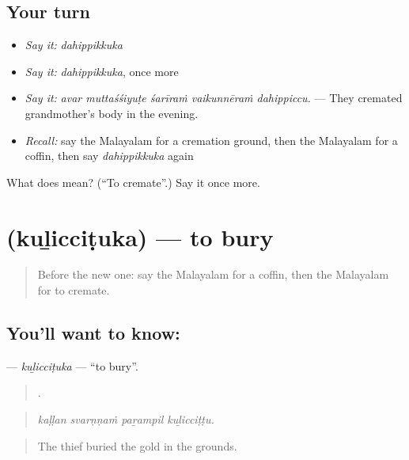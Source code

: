 \subsection*{Your turn}
\begin{itemize}
\raggedright
  \item \emph{Say it:} \emph{dahippikkuka}
  \item \emph{Say it:} \emph{dahippikkuka}, once more
  \item \emph{Say it:} \emph{avar muttaśśiyuṭe śarīraṁ vaikunnēraṁ dahippiccu.} — They cremated grandmother's body in the evening.
  \item \emph{Recall:} say the Malayalam for a cremation ground, then the Malayalam for a coffin, then say \emph{dahippikkuka} again
\end{itemize}

\begin{tcolorbox}[breakable,colback=teal!4,colframe=teal!35!black,title={Before you move on}]
What does  mean? (\textquotedblleft{}To cremate\textquotedblright{}.) Say it once more.
\end{tcolorbox}
\section[\texorpdfstring{\ml{കുഴിച്ചിടുക} (kuḻicciṭuka)}{കുഴിച്ചിടുക (kuḻicciṭuka)}]{ (kuḻicciṭuka) — to bury}

\label{lesson:ML-C391-kuliccituka}



\begin{quote}
Before the new one: say the Malayalam for a coffin, then the Malayalam for to cremate.
\end{quote}

\subsection*{You'll want to know: }
\textbf{} — \emph{kuḻicciṭuka} — \textquotedblleft{}to bury\textquotedblright{}.

\begin{quote}
   .
\end{quote}

\begin{quote}
\emph{kaḷḷan svarṇṇaṁ paṟampil kuḻicciṭṭu.}
\end{quote}

\begin{quote}
The thief buried the gold in the grounds.
\end{quote}

